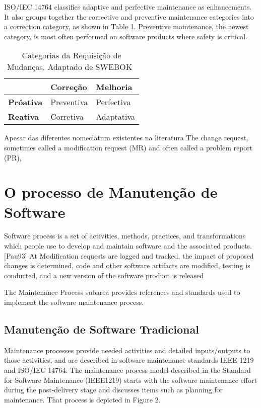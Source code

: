 ISO/IEC 14764 classifies adaptive and perfective
maintenance as enhancements. It also groups together the corrective and preventive maintenance
categories into a correction category, as shown in Table 1.
Preventive
maintenance, the newest category, is most often performed on software products where safety is
critical.
\begin{table}[htpb]

	\centering
	\caption{Categorias da Requisição de Mudanças. Adaptado de SWEBOK~\cite{4425813}}
	\label{tab:categorias_requisicao_mudanca}
	\begin{tabular}{l|l|l|}
		\cline{2-3}
	 & \textbf{Correção} & \textbf{Melhoria} \\ \hline
	 \multicolumn{1}{|l|}{\textbf{Próativa}} & Preventiva & Perfectiva \\ \hline
	 \multicolumn{1}{|l|}{\textbf{Reativa}} & Corretiva & Adaptativa \\ \hline
	\end{tabular}
 \end{table} 

Apesar das diferentes nomeclatura existentes na literatura The change request,
sometimes called a modification
request (MR) and often called a problem report (PR),
 
 \section{O processo de Manutenção de Software}
\label{sec:o_processo_de_manutecao_de_software}

Software process is a set of activities, methods, practices, and transformations which people use to
develop and maintain software and the associated products. [Pau93] At Modification requests are logged and tracked, the impact of proposed changes is determined, code and other software artifacts are modified, testing is conducted, and a new version of the software product is released

The Maintenance Process subarea provides references and standards used to implement the software
maintenance process.
\subsection{Manutenção de Software Tradicional}
\label{subsec:manutenção_de_software_tradicional}
Maintenance processes provide needed activities and
detailed inputs/outputs to those activities, and are described in software maintenance standards
IEEE 1219 and ISO/IEC 14764.
The maintenance process model described in the Standard for Software Maintenance (IEEE1219) starts
with the software maintenance effort during the post-delivery stage and discusses items such as
planning for maintenance. That process is depicted in Figure 2.

